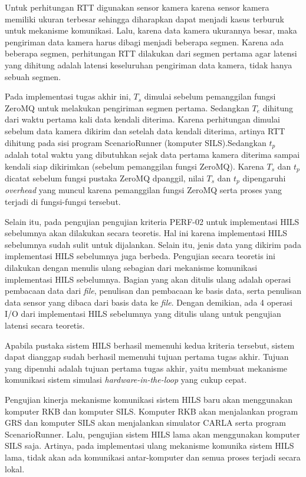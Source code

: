 Untuk perhitungan RTT digunakan sensor kamera karena sensor kamera memiliki
ukuran terbesar sehingga diharapkan dapat menjadi kasus terburuk untuk mekanisme
komunikasi. Lalu, karena data kamera ukurannya besar, maka pengiriman data
kamera harus dibagi menjadi beberapa segmen. Karena ada beberapa segmen,
perhitungan RTT dilakukan dari segmen pertama agar latensi yang dihitung adalah
latensi keseluruhan pengiriman data kamera, tidak hanya sebuah segmen.

Pada implementasi tugas akhir ini, $T_s$ dimulai sebelum pemanggilan fungsi
ZeroMQ untuk melakukan pengiriman segmen pertama. Sedangkan $T_e$ dihitung dari
waktu pertama kali data kendali diterima. Karena perhitungan dimulai sebelum
data kamera dikirim dan setelah data kendali diterima, artinya RTT dihitung pada
sisi program ScenarioRunner (komputer SILS).Sedangkan $t_p$ adalah
total waktu yang dibutuhkan sejak data pertama kamera diterima sampai kendali
siap dikirimkan (sebelum pemanggilan fungsi ZeroMQ). Karena $T_s$ dan $t_p$
dicatat sebelum fungsi pustaka ZeroMQ dpanggil, nilai $T_s$ dan $t_p$
dipengaruhi \textit{overhead} yang muncul karena pemanggilan fungsi ZeroMQ serta
proses yang terjadi di fungsi-fungsi tersebut.

Selain itu, pada pengujian pengujian kriteria PERF-02 untuk implementasi HILS
sebelumnya akan dilakukan secara teoretis. Hal ini karena implementasi HILS
sebelumnya sudah sulit untuk dijalankan. Selain itu, jenis data yang dikirim
pada implementasi HILS sebelumnya juga berbeda. Pengujian secara teoretis ini
dilakukan dengan menulis ulang sebagian dari mekanisme komunikasi implementasi
HILS sebelumnya. Bagian yang akan ditulis ulang adalah operasi pembacaan data
dari \textit{file}, penulisan dan pembacaan ke basis data, serta penulisan data
sensor yang dibaca dari basis data ke \textit{file}. Dengan demikian, ada 4
operasi I/O dari implementasi HILS sebelumnya yang ditulis ulang untuk pengujian
latensi secara teoretis.

Apabila pustaka sistem HILS berhasil memenuhi kedua kriteria tersebut, sistem
dapat dianggap sudah berhasil memenuhi tujuan pertama tugas akhir. Tujuan yang
dipenuhi adalah tujuan pertama tugas akhir, yaitu membuat mekanisme komunikasi
sistem simulasi \textit{hardware-in-the-loop} yang cukup cepat.

Pengujian kinerja mekanisme komunikasi sistem HILS baru akan menggunakan
komputer RKB dan komputer SILS. Komputer RKB akan menjalankan program GRS dan
komputer SILS akan menjalankan simulator CARLA serta program ScenarioRunner.
Lalu, pengujian sistem HILS lama akan menggunakan komputer SILS saja. Artinya,
pada implementasi ulang mekanisme komunika sistem HILS lama, tidak akan ada
komunikasi antar-komputer dan semua proses terjadi secara lokal.

